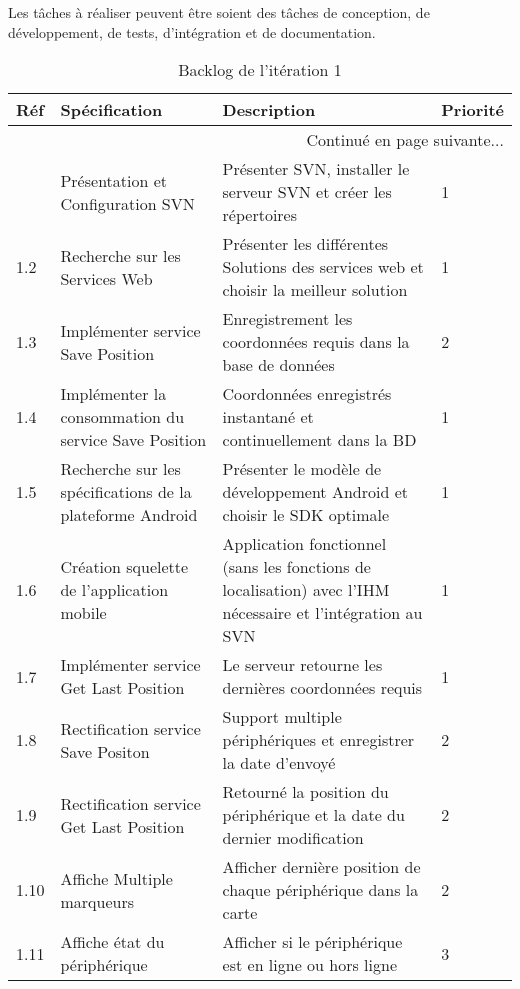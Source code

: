 
Les tâches à réaliser peuvent être soient des tâches de conception, de
développement, de tests, d'intégration et de documentation.

\begin{center}
    \footnotesize
    \begin{longtable}{| p{1cm} | p{5cm} | p{7cm} | p{1cm} |}
        \caption{Backlog de l'itération 1}
\label{tab:sprint1-backlog} \\

        \hline
        \textbf{Réf} & \textbf{Spécification} & \textbf{Description} & \textbf{Priorité} \\ \hline
        \endhead

        \hline \multicolumn{4}{|r|}{{Continué en page suivante$\dotsc$}} \\ \hline
        \endfoot

        \hline \hline
        \endlastfoot

        \hline
1.1 & Présentation et Configuration SVN & Présenter SVN, installer le serveur SVN et créer les répertoires & 1 \\ \hline
1.2 & Recherche sur les Services Web & Présenter les différentes Solutions des services web et choisir la meilleur solution & 1 \\ \hline
1.3 & Implémenter service Save Position & Enregistrement les coordonnées requis dans la base de données & 2 \\ \hline
1.4 & Implémenter la consommation du service Save Position & Coordonnées enregistrés instantané et continuellement dans la BD & 1 \\ \hline
1.5 & Recherche sur les spécifications de la plateforme Android & Présenter le modèle de développement Android et choisir le SDK optimale & 1 \\ \hline
1.6 & Création squelette de l'application mobile & Application fonctionnel (sans les fonctions de localisation) avec l'IHM nécessaire et l'intégration au SVN & 1 \\ \hline
1.7 & Implémenter service Get Last Position & Le serveur retourne les dernières coordonnées requis & 1 \\ \hline
1.8 & Rectification service Save Positon & Support multiple périphériques et enregistrer la date d'envoyé & 2 \\ \hline
1.9 & Rectification service Get Last Position & Retourné la position du périphérique et la date du dernier modification & 2 \\ \hline
1.10 & Affiche Multiple marqueurs & Afficher dernière position de chaque périphérique dans la carte & 2 \\ \hline
1.11 & Affiche état du périphérique & Afficher si le périphérique est en ligne ou hors ligne & 3 \\ \hline
    \end{longtable}
\end{center}


